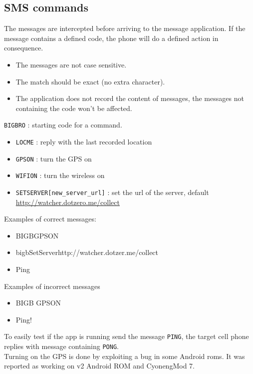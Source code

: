 \subsection{SMS commands}
\label{sec:dw-smscom}


The messages are intercepted before arriving to the message application. If the message contains a defined code, the phone will do a defined action in consequence.

\begin{itemize}
\item The messages are not case sensitive.
\item The match should be exact (no extra character).
\item The application does not record the content of messages, the messages not containing the code won't be affected.
\end{itemize}

\vspace{0.5cm}
\texttt{BIGBRO} : starting code for a command.
\begin{itemize}
\item \texttt{LOCME} : reply with the last recorded location
\item \texttt{GPSON} : turn the GPS on
\item \texttt{WIFION} : turn the wireless on
\item \texttt{SETSERVER[new\_server\_url]} : set
  the url of the server, default
  \url{http://watcher.dotzero.me/collect}
\end{itemize}

\vspace{0.5cm}
Examples of correct messages:
\begin{itemize}
\item BIGBGPSON
\item bigbSetServerhttp://watcher.dotzer.me/collect
\item Ping
\end{itemize}

\vspace{0.5cm}
Examples of incorrect messages
\begin{itemize}
\item BIGB GPSON
\item Ping!
\end{itemize}
\vspace{0.5cm}
To easily test if the app is running send the message \texttt{PING}, the target cell phone replies with message containing \texttt{PONG}.\\
Turning on the GPS is done by exploiting a bug in some Android roms. It was reported as working on v2 Android ROM and CyonengMod 7.

